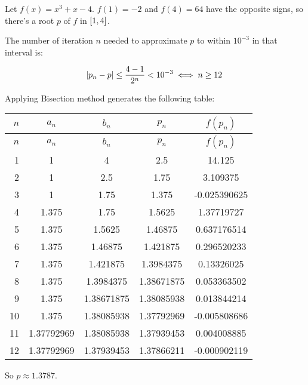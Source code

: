 \documentclass[../../Assignments.tex]{subfiles}
\begin{document}
\begin{solution}
    Let \(f(x) = x^3 + x − 4\). \(f(1) = -2\) and \(f(4) = 64\) have the
    opposite signs, so there's a root \(p\) of \(f\) in \(\interval{1}{4}\).

    The number of iteration \(n\) needed to approximate \(p\) to within
    \(10^{-3}\) in that interval is:

    \[\abs{p_n - p} \leq \frac{4 - 1}{2^n} < 10^{-3} \iff n \geq 12\]

    Applying Bisection method generates the following table:

    \begin{longtable}{r S[table-format=1.8] S[table-format=1.8] S[table-format=1.8] S[table-format=-1.9]}
        \toprule
        \(n\)  &   {\(a_n\)}   &   {\(b_n\)}   &   {\(p_n\)}   &  {\(f(p_n)\)}  \\
        \midrule
        \endfirsthead
        \(n\)  &   {\(a_n\)}   &   {\(b_n\)}   &   {\(p_n\)}   &  {\(f(p_n)\)}  \\
        \midrule
          &  1            &  4            &  2.5          &  14.125        \\
            2  &  1            &  2.5          &  1.75         &   3.109375     \\
            3  &  1            &  1.75         &  1.375        &  -0.025390625  \\
            4  &  1.375        &  1.75         &  1.5625       &   1.37719727   \\
            5  &  1.375        &  1.5625       &  1.46875      &   0.637176514  \\
            6  &  1.375        &  1.46875      &  1.421875     &   0.296520233  \\
            7  &  1.375        &  1.421875     &  1.3984375    &   0.13326025   \\
            8  &  1.375        &  1.3984375    &  1.38671875   &   0.053363502  \\
            9  &  1.375        &  1.38671875   &  1.38085938   &   0.013844214  \\
           10  &  1.375        &  1.38085938   &  1.37792969   &  -0.005808686  \\
           11  &  1.37792969   &  1.38085938   &  1.37939453   &   0.004008885  \\
           12  &  1.37792969   &  1.37939453   &  1.37866211   &  -0.000902119  \\
        \bottomrule
    \end{longtable}

    So \(p \approx \num{1.3787}\).
\end{solution}
\end{document}
